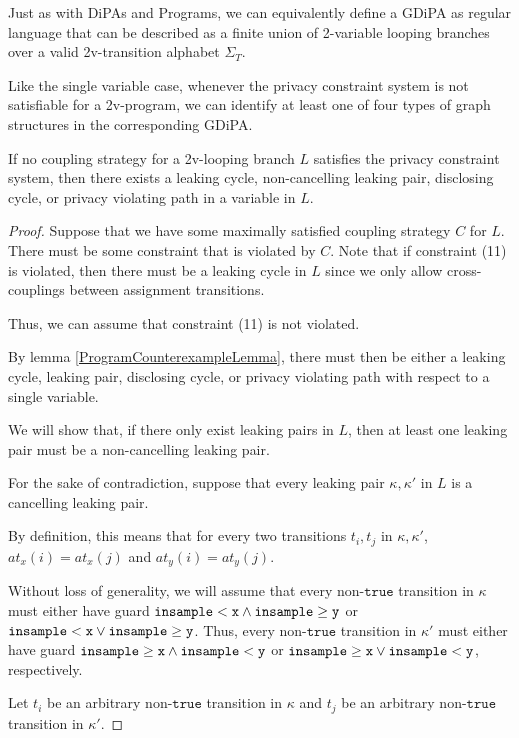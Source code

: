 Just as with DiPAs and Programs, we can equivalently define a GDiPA as regular language that can be described as a finite union of 2-variable looping branches over a valid 2v-transition alphabet $\Sigma_T$. 

Like the single variable case, whenever the privacy constraint system is not satisfiable for a 2v-program, we can identify at least one of four types of graph structures in the corresponding GDiPA.

\begin{lemma}
    If no coupling strategy for a 2v-looping branch $L$ satisfies the privacy constraint system, then there exists a leaking cycle, non-cancelling leaking pair, disclosing cycle, or privacy violating path in a variable in $L$.
\end{lemma}
\begin{proof}
    Suppose that we have some maximally satisfied coupling strategy $C$ for $L$. There must be some constraint that is violated by $C$. Note that if constraint (11) is violated, then there must be a leaking cycle in $L$ since we only allow cross-couplings between assignment transitions. 

    Thus, we can assume that constraint (11) is not violated. 

    By lemma \ref{ProgramCounterexampleLemma}, there must then be either a leaking cycle, leaking pair, disclosing cycle, or privacy violating path with respect to a single variable. 

    We will show that, if there only exist leaking pairs in $L$, then at least one leaking pair must be a non-cancelling leaking pair. 

    For the sake of contradiction, suppose that every leaking pair $\kappa, \kappa'$ in $L$ is a cancelling leaking pair. 

    By definition, this means that for every two transitions $t_i, t_j$ in $\kappa, \kappa'$, $at_x(i) = at_x(j)$ and $at_y(i) = at_y(j)$.

    Without loss of generality, we will assume that every non-$\texttt{true}$ transition in $\kappa$ must either have guard $\lguard[\texttt{x}]\land\gguard[\texttt{y}]$ or $\lguard[\texttt{x}]\lor\gguard[\texttt{y}]$. Thus, every non-$\texttt{true}$ transition in $\kappa'$ must either have guard $\gguard[\texttt{x}]\land\lguard[\texttt{y}]$ or $\gguard[\texttt{x}]\lor\lguard[\texttt{y}]$, respectively. 

    Let $t_i$ be an arbitrary non-$\texttt{true}$ transition in $\kappa$ and $t_j$ be an arbitrary non-$\texttt{true}$ transition in $\kappa'$.


\end{proof}
